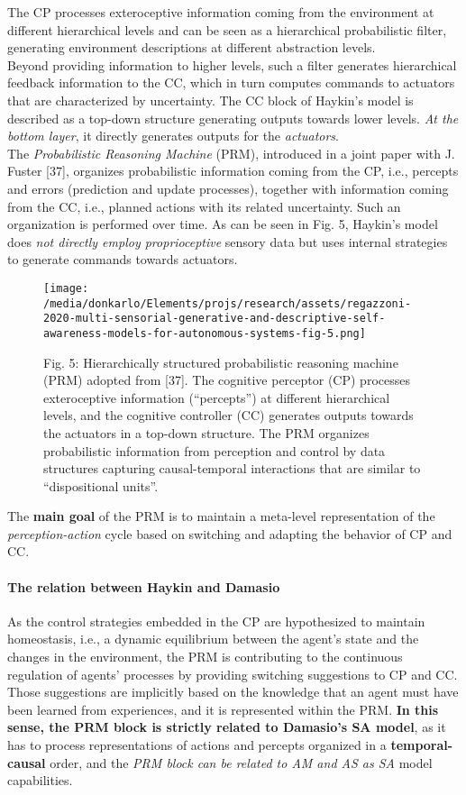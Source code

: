 \documentclass{article}
\begin{document}
		The CP processes exteroceptive information
		coming from the environment at different hierarchical levels
		and can be seen as a hierarchical probabilistic filter, generating environment descriptions at different abstraction levels.
		\\
		Beyond providing information to higher levels, such a filter
		generates hierarchical feedback information to the CC, which
		in turn computes commands to actuators that are characterized
		by uncertainty. The CC block of Haykin’s model is described
		as a top-down structure generating outputs towards lower
		levels. \emph{At the bottom layer}, it directly generates outputs for
		the \emph{actuators}.
		\\
		The \emph{Probabilistic Reasoning Machine} (PRM), introduced
		in a joint paper with J. Fuster [37], organizes probabilistic
		information coming from the CP, i.e., percepts and errors
		(prediction and update processes), together with information
		coming from the CC, i.e., planned actions with its related
		uncertainty. Such an organization is performed over time.
		As can be seen in Fig. 5, Haykin’s model does \emph{not directly
		employ proprioceptive} sensory data but uses internal strategies
		to generate commands towards actuators.
		\begin{figure*}
			\centering
			\texttt{[image: /media/donkarlo/Elements/projs/research/assets/regazzoni-2020-multi-sensorial-generative-and-descriptive-self-awareness-models-for-autonomous-systems-fig-5.png]}
			\caption{Fig. 5: Hierarchically structured probabilistic reasoning machine (PRM) adopted from [37]. The cognitive perceptor (CP) processes exteroceptive information (“percepts”) at different hierarchical levels, and the cognitive controller (CC) generates outputs towards the actuators in a top-down structure. The PRM organizes probabilistic information from perception and control by data structures capturing causal-temporal interactions that are similar to “dispositional units”.
			}
			\label{fig:regazzoni-2020-multi-sensorial-generative-and-descriptive-self-awareness-models-for-autonomous-systems-fig-5.png}
		\end{figure*}
		The \textbf{main goal} of the PRM is to maintain a meta-level representation of the \emph{perception-action} cycle based on switching and adapting the behavior of CP and CC.
		
		\paragraph{The relation between Haykin and Damasio}As the control strategies embedded in the CP are hypothesized to maintain homeostasis, i.e., a dynamic equilibrium between the agent’s state and the changes in the environment, the PRM is contributing
		to the continuous regulation of agents’ processes by providing
		switching suggestions to CP and CC. Those suggestions are
		implicitly based on the knowledge that an agent must have
		been learned from experiences, and it is represented within
		the PRM. \textbf{In this sense, the PRM block is strictly related to
		Damasio’s SA model}, as it has to process representations of
		actions and percepts organized in a \textbf{temporal-causal} order, and
		the \emph{PRM block can be related to AM and AS as SA} model
		capabilities.
\end{document}
